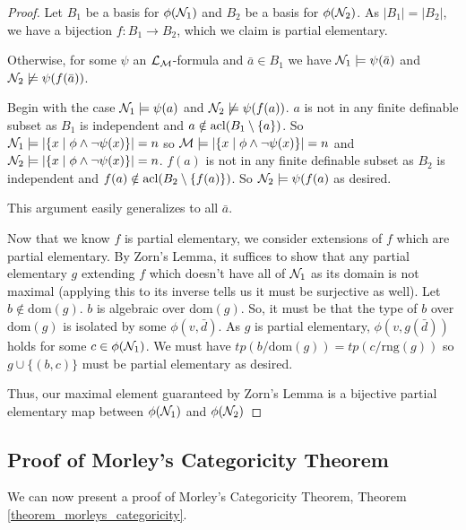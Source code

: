 \begin{proof}
Let \(B_1\) be a basis for \(\phi(\mathcal{N}_1)\) and \(B_2\) be a basis for \(\phi(\mathcal{N}_2)\).
As \(|B_1| = |B_2|\), we have a bijection \(f: B_1 \to B_2\), which we claim is partial elementary. 

Otherwise, for some \(\psi\) an \(\mathcal{L}_{\mathcal{M}}\)-formula and \(\bar{a} \in B_1\) we have \(\mathcal{N}_1 \models \psi(\bar{a})\) and \(\mathcal{N}_2 \not\models \psi(f(\bar{a}))\). 

Begin with the case \(\mathcal{N}_1 \models \psi(a)\) and \(\mathcal{N}_2 \not \models \psi(f(a))\). 
\(a\) is not in any finite definable subset as \(B_1\) is independent and \(a \notin \text{acl}(B_1 \setminus\{a\})\). 
So \(\mathcal{N}_1 \models |\{x \mid \phi \land \neg \psi(x)\}| = n\) so \(\mathcal{M} \models |\{x \mid \phi \land \neg \psi(x)\}| = n\)
and \(\mathcal{N}_2 \models |\{x \mid \phi \land \neg \psi(x)\}| = n\).
\(f(a)\) is not in any finite definable subset as \(B_2\) is independent and \(f(a) \notin \text{acl}(B_2 \setminus\{f(a)\})\). 
So \(\mathcal{N}_2 \models \psi(f(a)\) as desired. 

This argument easily generalizes to all \(\bar{a}\). 

Now that we know \(f\) is partial elementary, we consider extensions of \(f\) which are partial elementary. 
By Zorn's Lemma, it suffices to show that any partial elementary \(g\) extending \(f\) which doesn't have all of \(\mathcal{N}_1\) as its domain is not maximal (applying this to its inverse tells us it must be surjective as well).
Let \(b \notin \text{dom}(g)\). \(b\) is algebraic over \(\text{dom}(g)\). %
So, it must be that the type of \(b\) over \(\text{dom}(g)\) is isolated by some \(\phi(v, \bar{d})\).
As \(g\) is partial elementary, \(\phi(v, g(\bar{d}))\) holds for some \(c \in \phi(\mathcal{N}_1)\).  %
We must have \(tp(b/\text{dom}(g)) = tp (c/\text{rng}(g))\) so \(g \cup \{(b, c)\}\) must be partial elementary as desired. 

Thus, our maximal element guaranteed by Zorn's Lemma is a bijective partial elementary map between \(\phi(\mathcal{N}_1)\) and  \(\phi(\mathcal{N}_2)\)
\end{proof}

\subsection{Proof of Morley's Categoricity Theorem}

We can now present a proof of Morley's Categoricity Theorem, Theorem \ref{theorem_morleys_categoricity}.

